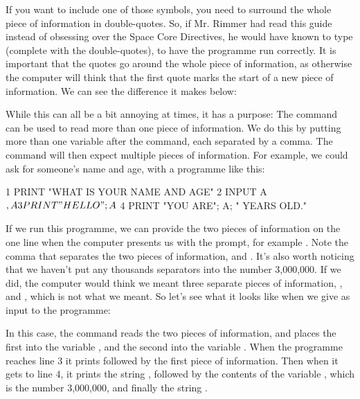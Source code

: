 \needspace{4cm}
If you want to include one of those symbols, you need to surround the
whole piece of information in double-quotes.  So, if Mr. Rimmer had
read this guide instead of obsessing over the Space Core Directives,
he would have known to type  (complete with the
double-quotes), to have the programme 
  run correctly.  It is important that the quotes go around the whole
  piece of information, as otherwise the computer will think that the
  first quote marks the start of a new piece of information.  We can
  see the difference it makes below:


\needspace{1.5cm}
While this can all be a bit annoying at times, it has a purpose: The
 command can be used to read more than one piece of
information.  We do this by putting more than one variable after the
 command, each separated by a comma.  The 
command will then expect multiple pieces of information.  For example,
we could ask for someone's name and age, with a programme like this:

\begin{screenoutput}
  1 PRINT "WHAT IS YOUR NAME AND AGE"
  2 INPUT A$, A
  3 PRINT "HELLO "; A$
  4 PRINT "YOU ARE"; A; " YEARS OLD."
\end{screenoutput}

\needspace{4cm}
If we run this programme, we can provide the two pieces of information
on the one line when the computer presents us with the  prompt,
for example . Note the comma that separates the
two pieces of information,  and .  It's also
worth noticing that we haven't put any thousands separators into the
number 3,000,000.  If we did, the computer would think we meant three
separate pieces of information, ,  and ,
which is not what we meant.  So let's see what it looks like when we
give  as input to the programme:


In this case, the  command reads the two pieces of
information, and places the first into the variable , and the second
into the variable . When the programme reaches line 3 it prints
 followed by the first piece of information.
Then when it gets to line 4, it prints the string ,
followed by the contents of the variable , which is the number
3,000,000, and finally the string .

